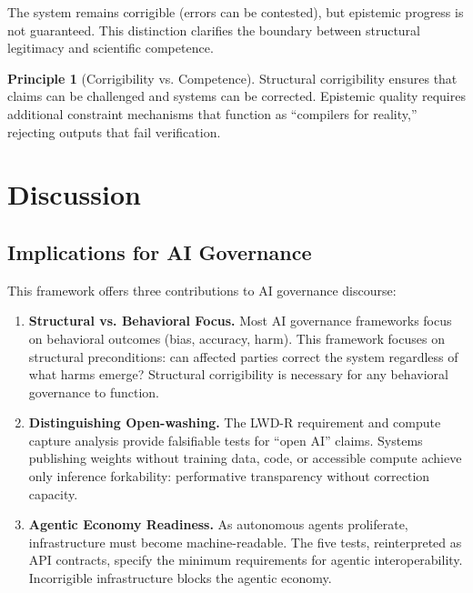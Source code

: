 \documentclass[11pt,a4paper]{article}
\theoremstyle{definition}
\newtheorem{principle}{Principle}[section]
\begin{document}
The system remains corrigible (errors can be contested), but epistemic progress is not guaranteed. This distinction clarifies the boundary between structural legitimacy and scientific competence.

\begin{principle}[Corrigibility vs. Competence]
Structural corrigibility ensures that claims can be challenged and systems can be corrected. Epistemic quality requires additional constraint mechanisms that function as ``compilers for reality,'' rejecting outputs that fail verification.
\end{principle}


\section{Discussion}
\label{sec:discussion}

\subsection{Implications for AI Governance}

This framework offers three contributions to AI governance discourse:

\begin{enumerate}
    \item \textbf{Structural vs. Behavioral Focus.} Most AI governance frameworks focus on behavioral outcomes (bias, accuracy, harm). This framework focuses on structural preconditions: can affected parties correct the system regardless of what harms emerge? Structural corrigibility is necessary for any behavioral governance to function.

    \item \textbf{Distinguishing Open-washing.} The LWD-R requirement and compute capture analysis provide falsifiable tests for ``open AI'' claims. Systems publishing weights without training data, code, or accessible compute achieve only inference forkability: performative transparency without correction capacity.

    \item \textbf{Agentic Economy Readiness.} As autonomous agents proliferate, infrastructure must become machine-readable. The five tests, reinterpreted as API contracts, specify the minimum requirements for agentic interoperability. Incorrigible infrastructure blocks the agentic economy.
\end{enumerate}
\end{document}
